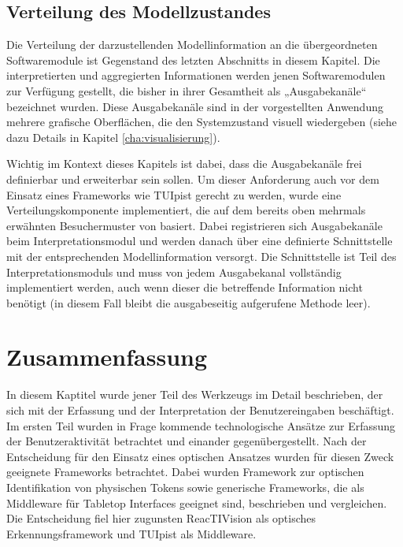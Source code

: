 
\subsection{Verteilung des Modellzustandes} %
\label{sub:verteilung_des_modellzustandes}

Die Verteilung der darzustellenden Modellinformation an die übergeordneten Softwaremodule ist Gegenstand des letzten Abschnitts in diesem Kapitel. Die interpretierten und aggregierten Informationen werden jenen Softwaremodulen zur Verfügung gestellt, die bisher in ihrer Gesamtheit als „Ausgabekanäle“ bezeichnet wurden. Diese Ausgabekanäle sind in der vorgestellten Anwendung mehrere grafische Oberflächen, die den Systemzustand visuell wiedergeben (siehe dazu Details in Kapitel \ref{cha:visualisierung}). 

Wichtig im Kontext dieses Kapitels ist dabei, dass die Ausgabekanäle frei definierbar und erweiterbar sein sollen. Um dieser Anforderung auch vor dem Einsatz eines Frameworks wie TUIpist gerecht zu werden, wurde eine Verteilungskomponente implementiert, die auf dem bereits oben mehrmals erwähnten Besuchermuster von \citet{Gamma95} basiert. Dabei registrieren sich Ausgabekanäle beim Interpretationsmodul und werden danach über eine definierte Schnittstelle mit der entsprechenden Modellinformation versorgt. Die Schnittstelle ist Teil des Interpretationsmoduls und muss von jedem Ausgabekanal vollständig implementiert werden, auch wenn dieser die betreffende Information nicht benötigt (in diesem Fall bleibt die ausgabeseitig aufgerufene Methode leer). 


\section{Zusammenfassung} %
\label{sec:input_zusammenfassung}

In diesem Kaptitel wurde jener Teil des Werkzeugs im Detail beschrieben, der sich mit der Erfassung und der Interpretation der Benutzereingaben beschäftigt. Im ersten Teil wurden in Frage kommende technologische Ansätze zur Erfassung der Benutzeraktivität betrachtet und einander gegenübergestellt. Nach der Entscheidung für den Einsatz eines optischen Ansatzes wurden für diesen Zweck geeignete Frameworks betrachtet. Dabei wurden Framework zur optischen Identifikation von physischen Tokens sowie generische Frameworks, die als Middleware für Tabletop Interfaces geeignet sind, beschrieben und vergleichen. Die Entscheidung fiel hier zugunsten ReacTIVision \citep{Kaltenbrunner07} als optisches Erkennungsframework und TUIpist \citep{Furtmuller07a} als Middleware.

